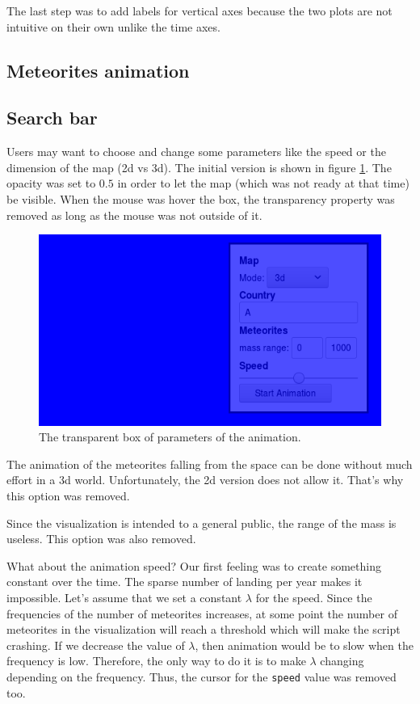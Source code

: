 \documentclass[10pt,conference,compsocconf]{IEEEtran}
\begin{document}
The last step was to add labels for vertical axes because the two plots are not intuitive on their own unlike the time axes.

\subsection{Meteorites animation}


\subsection{Search bar}

Users may want to choose and change some parameters like the speed or the dimension of the map (2d vs 3d). The initial version is shown in figure \ref{fig:box_tool}. The opacity was set to $0.5$ in order to let the map (which was not ready at that time) be visible. When the mouse was hover the box, the transparency property was removed as long as the mouse was not outside of it.

\begin{figure}[H]
  \centering
  \includegraphics[width=\columnwidth]{images/animation_box_tool.png}
  \vspace{-3mm}
  \caption{The transparent box of parameters of the animation.}
  \label{fig:box_tool}
\end{figure}

The animation of the meteorites falling from the space can be done without much effort in a 3d world. Unfortunately, the 2d version does not allow it. That's why this option was removed.

Since the visualization is intended to a general public, the range of the mass is useless. This option was also removed.

What about the animation speed? Our first feeling was to create something constant over the time. The sparse number of landing per year makes it impossible. Let's assume that we set a constant $\lambda$ for the speed. Since the frequencies of the number of meteorites increases, at some point the number of meteorites in the visualization will reach a threshold which will make the script crashing. If we decrease the value of $\lambda$, then animation would be to slow when the frequency is low. Therefore, the only way to do it is to make $\lambda$ changing depending on the frequency. Thus, the cursor for the \texttt{speed} value was removed too.
\end{document}
